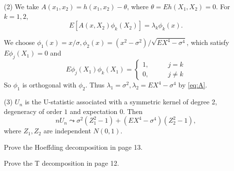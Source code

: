 \begin{solution}
(2) We  take $A(x_1, x_2) = h(x_1, x_2) - \theta$, where $\theta = E h(X_1, X_2) = 0$.
For $k=1,2$, 
\begin{equation}\label{eq:A}
    E[A(x,X_2)\phi_k(X_2)] = \lambda_k \phi_k(x).
\end{equation}

We choose $\phi_1(x) = x/\sigma, \phi_2(x) = (x^2-\sigma^2)/\sqrt{EX^4-\sigma^4}$, which satisfy $E\phi_j(X_1)=0$ and 
\begin{equation*}
    E\phi_j(X_1)\phi_k(X_1) = \left\{
    \begin{aligned}
        1, & \quad\quad j=k \\
        0, & \quad\quad j\neq k
    \end{aligned}
    \right.
\end{equation*}
So $\phi_1$ is orthogonal with $\phi_2$. Thus $\lambda_1 = \sigma^2, \lambda_2=EX^4-\sigma^4$ by \eqref{eq:A}.

(3) $U_n$ is the U-statistic associated with a symmetric kernel of degree 2, degeneracy of order $1$ and expectation $0$. Then
\begin{equation*}
        nU_n \leadsto \sigma^2(Z_1^2-1) + (EX^4-\sigma^4)(Z_2^2-1),
\end{equation*}
where $Z_1, Z_2$ are independent $N(0,1)$. 

\end{solution}




\begin{problem}
    Prove the Hoeffding decomposition in page 13.
\end{problem}


\begin{solution}
    
\end{solution}




\begin{problem}
    Prove the T decomposition in page 12.
\end{problem}


\begin{solution}
    
\end{solution}




